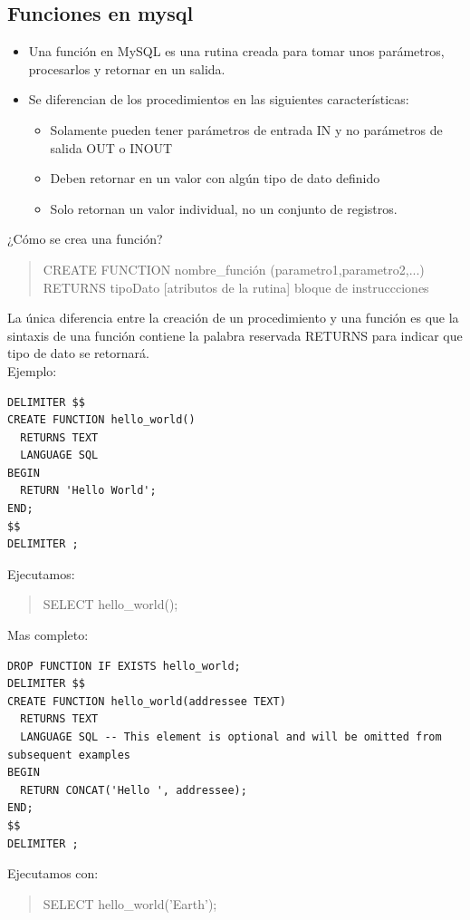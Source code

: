 \documentclass[4paper]{article}
\newcommand{\M}{mysql}
\begin{document}
\subsection{Funciones en \M}
\begin{itemize}
\item Una función en MySQL es una rutina creada para tomar unos parámetros, procesarlos y retornar en un salida.
\item Se diferencian de los procedimientos en las siguientes características:
\begin{itemize}
\item Solamente pueden tener parámetros de entrada IN y no parámetros de salida OUT o INOUT
\item Deben retornar en un valor con algún tipo de dato definido
\item Solo retornan un valor individual, no un conjunto de registros.
\end{itemize}
\end{itemize}
¿Cómo se crea una función?
\begin{quote}
CREATE FUNCTION nombre\_función (parametro1,parametro2,...)
RETURNS tipoDato
[atributos de la rutina]
bloque de instruccciones
\end{quote}
La única diferencia entre la creación de un procedimiento y una función es que la sintaxis de una función contiene la palabra reservada RETURNS para indicar que tipo de dato se retornará.\\
Ejemplo:
\begin{verbatim}
DELIMITER $$
CREATE FUNCTION hello_world()
  RETURNS TEXT
  LANGUAGE SQL
BEGIN
  RETURN 'Hello World';
END;
$$
DELIMITER ;
\end{verbatim}
Ejecutamos:
\begin{quote}
SELECT hello\_world();
\end{quote}
Mas completo:
\begin{verbatim}
DROP FUNCTION IF EXISTS hello_world;
DELIMITER $$
CREATE FUNCTION hello_world(addressee TEXT)
  RETURNS TEXT
  LANGUAGE SQL -- This element is optional and will be omitted from subsequent examples
BEGIN
  RETURN CONCAT('Hello ', addressee);
END;
$$
DELIMITER ;
\end{verbatim}
Ejecutamos con:
\begin{quote}
SELECT hello\_world('Earth');
\end{quote}

\newpage
\end{document}
